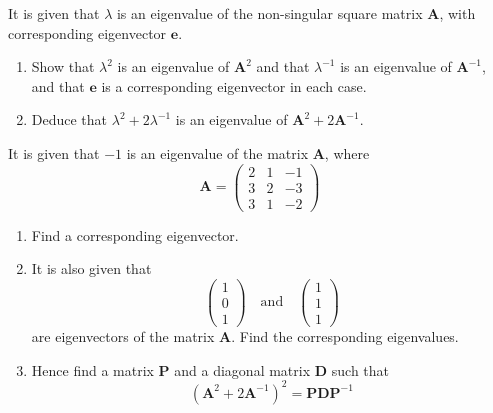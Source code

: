 \documentclass[leqno]{article}
\begin{document}
\begin{enumerate}[
  label=\textbf{\arabic*.},
  leftmargin=*,
  topsep=0pt,
  partopsep=0pt,
  parsep=0pt
]
It is given that $\lambda$ is an eigenvalue of the non-singular square matrix $\mathbf{A}$, with corresponding eigenvector $\mathbf{e}$. \\
\begin{enumerate}[label=\textbf{(\alph*)}]
  \item Show that $\lambda^{2}$ is an eigenvalue of $\mathbf{A}^{2}$ and that $\lambda^{-1}$ is an eigenvalue of $\mathbf{A}^{-1}$, and that $\mathbf{e}$ is a corresponding eigenvector in each case.  \\
  \item Deduce that $\lambda^{2} + 2\lambda^{-1}$ is an eigenvalue of $\mathbf{A}^{2} + 2\mathbf{A}^{-1}$.  \\
\end{enumerate}
It is given that $-1$ is an eigenvalue of the matrix $\mathbf{A}$, where
\[\mathbf{A} = \begin{pmatrix} 2 & 1 & -1 \\ 3 & 2 & -3 \\ 3 & 1 & -2 \end{pmatrix}\]
\begin{enumerate}[label=\textbf{(\alph*)}, resume]
  \item Find a corresponding eigenvector.  \\
  \item It is also given that
  \[\begin{pmatrix} 1 \\ 0 \\ 1 \end{pmatrix} \quad \text{and} \quad \begin{pmatrix} 1 \\ 1 \\ 1 \end{pmatrix}\]
  are eigenvectors of the matrix $\mathbf{A}$. Find the corresponding eigenvalues.  \\
  \item Hence find a matrix $\mathbf{P}$ and a diagonal matrix $\mathbf{D}$ such that
  \[\left(\mathbf{A}^{2} + 2\mathbf{A}^{-1}\right)^2 = \mathbf{P}\mathbf{D}\mathbf{P}^{-1}\] 
\end{enumerate}

\newpage

\questionitem


\end{enumerate}
\end{document}
